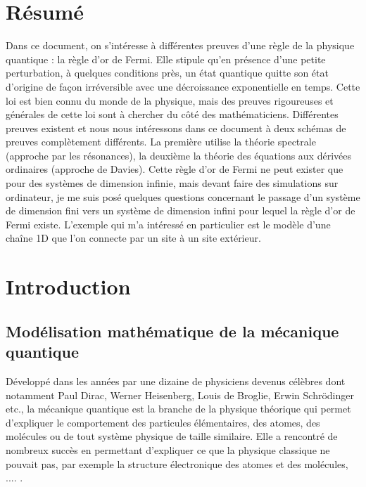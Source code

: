 \documentclass[12pt,openany,a4paper, titlepage]{article}
\theoremstyle{definition}
\theoremstyle{definition}
\theoremstyle{definition}
\theoremstyle{definition}
\theoremstyle{definition}
\theoremstyle{definition}
\begin{document}
\newpage

\section{Résumé}

Dans ce document, on s'intéresse à différentes preuves d'une règle de la physique quantique : la règle d'or de Fermi. Elle stipule qu'en présence d'une petite perturbation, à quelques conditions près, un état quantique quitte son état d'origine de façon irréversible avec une décroissance exponentielle en temps. Cette loi est bien connu du monde de la physique, mais des preuves rigoureuses et générales de cette loi sont à chercher du côté des mathématiciens. Différentes preuves existent et nous nous intéressons dans ce document à deux schémas de preuves complètement différents. La première utilise la théorie spectrale (approche par les résonances), la deuxième la théorie des équations aux dérivées ordinaires (approche de Davies). Cette règle d'or de Fermi ne peut exister que pour des systèmes de dimension infinie, mais devant faire des simulations sur ordinateur, je me suis posé quelques questions concernant le passage d'un système de dimension fini vers un système de dimension infini pour lequel la règle d'or de Fermi existe. L'exemple qui m'a intéressé en particulier est le modèle d'une chaîne 1D que l'on connecte par un site à un site extérieur.

\newpage

\tableofcontents

\newpage

\section{Introduction}

\subsection{Modélisation mathématique de la mécanique quantique}

Développé dans les années par une dizaine de physiciens devenus célèbres dont notamment Paul Dirac, Werner Heisenberg, Louis de Broglie, Erwin Schrödinger etc.,  la mécanique quantique est la branche de la physique théorique qui permet d'expliquer le comportement des particules élémentaires, des atomes, des molécules ou de tout système physique de taille similaire. Elle a rencontré de nombreux succès en permettant d'expliquer ce que la physique classique ne pouvait pas, par exemple la structure électronique des atomes et des molécules, .... . 
\end{document}
